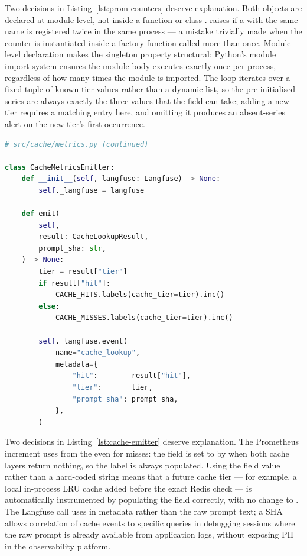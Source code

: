 Two decisions in Listing~\ref{lst:prom-counters} deserve explanation.
Both  objects are declared at module level, not inside a
function or class .  raises
 if a
 with the same name is registered twice in the same
process --- a mistake trivially made when the counter is instantiated
inside a factory function called more than once. Module-level declaration
makes the singleton property structural: Python's module import system
ensures the module body executes exactly once per process, regardless of
how many times the module is imported. The  loop iterates over
a fixed tuple of known tier values rather than a dynamic list, so the
pre-initialised series are always exactly the three values that the
  field can take; adding a new tier
requires a matching entry here, and omitting it produces an absent-series
alert on the new tier's first occurrence.

\begin{lstlisting}[language=Python,
  caption={CacheMetricsEmitter: dual Prometheus and Langfuse emission},
  label={lst:cache-emitter}]
# src/cache/metrics.py (continued)

class CacheMetricsEmitter:
    def __init__(self, langfuse: Langfuse) -> None:
        self._langfuse = langfuse

    def emit(
        self,
        result: CacheLookupResult,
        prompt_sha: str,
    ) -> None:
        tier = result["tier"]
        if result["hit"]:
            CACHE_HITS.labels(cache_tier=tier).inc()
        else:
            CACHE_MISSES.labels(cache_tier=tier).inc()

        self._langfuse.event(
            name="cache_lookup",
            metadata={
                "hit":        result["hit"],
                "tier":       tier,
                "prompt_sha": prompt_sha,
            },
        )
\end{lstlisting}

Two decisions in Listing~\ref{lst:cache-emitter} deserve explanation.
The Prometheus increment uses  from the 
even for misses: the  field is set to  by
 when both cache layers return nothing, so the
label is always populated. Using the field value rather than a
hard-coded  string means that a future cache tier --- for
example, a local in-process LRU cache added before the exact Redis check
--- is automatically instrumented by populating the  field
correctly, with no change to . The Langfuse
 call uses  in metadata rather than the
raw prompt text; a SHA allows correlation of cache events to specific
queries in debugging sessions where the raw prompt is already available
from application logs, without exposing PII in the observability
platform.


